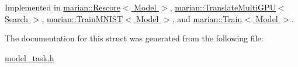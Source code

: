 Implemented in \hyperlink{classmarian_1_1Rescore_ac514b4d602ec5c08fb0730690327ae3e}{marian\+::\+Rescore$<$ Model $>$}, \hyperlink{classmarian_1_1TranslateMultiGPU_a6d0b7f15fe6870b772cc9aa03d361840}{marian\+::\+Translate\+Multi\+G\+P\+U$<$ Search $>$}, \hyperlink{classmarian_1_1TrainMNIST_a5dbea84161b6257b405b6c18a081989d}{marian\+::\+Train\+M\+N\+I\+S\+T$<$ Model $>$}, and \hyperlink{classmarian_1_1Train_afb36c886041a3da8e8d7cf91b5088d51}{marian\+::\+Train$<$ Model $>$}.



The documentation for this struct was generated from the following file\+:\begin{DoxyCompactItemize}
\item 
\hyperlink{model__task_8h}{model\+\_\+task.\+h}\end{DoxyCompactItemize}
